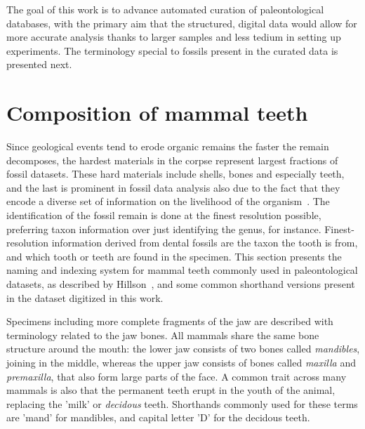 \documentclass[english,twoside,openright]{UH_DS_MSc}
\begin{document}
The goal of this work is to advance automated curation of paleontological databases, 
with the primary aim that the structured, digital data would allow for 
more accurate analysis thanks to larger samples and less tedium in 
setting up experiments. The terminology special to fossils present in 
the curated data is presented next.

\section{Composition of mammal teeth}
\label{sect:mammal_teeth}


Since geological events tend to erode organic remains the faster the remain decomposes, the hardest materials in 
the corpse represent largest fractions of fossil datasets. These hard materials include shells, bones and especially teeth, and 
the last is prominent in fossil data analysis also due to the fact that they encode a diverse set of information on 
the livelihood of the organism~\cite{Faith_Lyman_2019}. The identification of the fossil remain is done at the finest resolution possible,
preferring taxon information over just identifying the genus, for instance. Finest-resolution information 
derived from dental fossils are the taxon the tooth is from, and which tooth or teeth are found in the specimen.
This section presents the naming and indexing system for mammal teeth commonly used in paleontological datasets,
as described by Hillson~\cite{Hillson_2005}, and some common shorthand versions present in the dataset digitized in this work.

Specimens including more complete fragments of the jaw are described with terminology related 
to the jaw bones. All mammals share the same bone structure around the mouth: the lower jaw consists 
of two bones called \textit{mandibles}, joining in the middle, whereas the upper jaw consists of bones called 
\textit{maxilla} and \textit{premaxilla}, that also form large parts of the face.
A common trait across many mammals is also that the permanent teeth erupt in the 
youth of the animal, replacing the 'milk' or \textit{decidous} teeth. Shorthands commonly used for these 
terms are 'mand' for mandibles, and capital letter 'D' for the decidous teeth.
\end{document}
